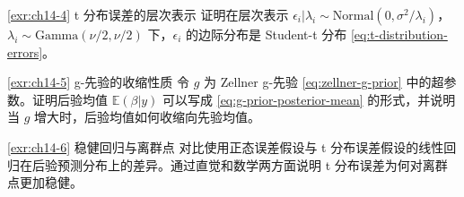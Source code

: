 \begin{Exercise}{\ref{exr:ch14-4} t 分布误差的层次表示}
\label{exr:ch14-4}
证明在层次表示 $\epsilon_i | \lambda_i \sim \text{Normal}(0, \sigma^2/\lambda_i)$，$\lambda_i \sim \text{Gamma}(\nu/2, \nu/2)$ 下，$\epsilon_i$ 的边际分布是 Student-t 分布 \cref{eq:t-distribution-errors}。
\end{Exercise}

\begin{Exercise}{\ref{exr:ch14-5} g-先验的收缩性质}
\label{exr:ch14-5}
令 $g$ 为 Zellner g-先验 \cref{eq:zellner-g-prior} 中的超参数。证明后验均值 $\mathbb{E}(\beta | y)$ 可以写成 \cref{eq:g-prior-posterior-mean} 的形式，并说明当 $g$ 增大时，后验均值如何收缩向先验均值。
\end{Exercise}

\begin{Exercise}{\ref{exr:ch14-6} 稳健回归与离群点}
\label{exr:ch14-6}
对比使用正态误差假设与 t 分布误差假设的线性回归在后验预测分布上的差异。通过直觉和数学两方面说明 t 分布误差为何对离群点更加稳健。
\end{Exercise}

\endinput
